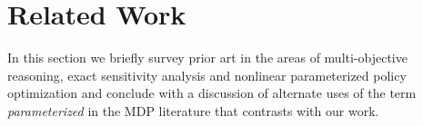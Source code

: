 \section{Related Work}
\label{sec:background}


In this section we briefly survey prior art in the areas of multi-objective reasoning, exact sensitivity analysis and nonlinear parameterized policy optimization and conclude with a discussion of alternate uses of the term \emph{parameterized} in the MDP literature that contrasts with our work.


